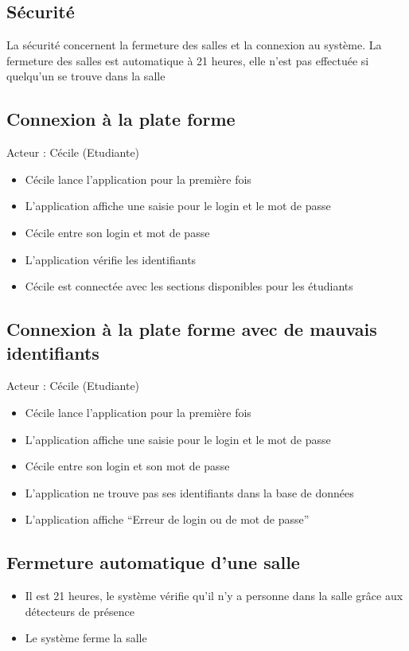 \newpage

\subsection{Sécurité}

La sécurité concernent la fermeture des salles et la connexion au système. La fermeture des salles est automatique à 21 heures, elle n'est pas effectuée si quelqu'un se trouve dans la salle

\subsection*{Connexion à la plate forme}
Acteur : Cécile (Etudiante)
\begin{itemize}
\item Cécile lance l’application pour la première fois 
\item L’application affiche une saisie pour le login et le mot de passe 
\item Cécile entre son login et mot de passe 
\item L’application vérifie les identifiants 
\item Cécile est connectée avec les sections disponibles pour les étudiants 
\end{itemize}

\subsection*{Connexion à la plate forme avec de mauvais identifiants}
Acteur : Cécile (Etudiante)
\begin{itemize}
\item Cécile lance l’application pour la première fois 
\item L’application affiche une saisie pour le login et le mot de passe 
\item Cécile entre son login et son mot de passe 
\item L’application ne trouve pas ses identifiants dans la base de données 
\item L’application affiche “Erreur de login ou de mot de passe” 
\end{itemize}

\subsection*{Fermeture automatique d’une salle}
\begin{itemize}
\item Il est 21 heures, le système vérifie qu’il n’y a personne dans la salle grâce aux détecteurs de présence 
\item Le système ferme la salle       
\end{itemize}

